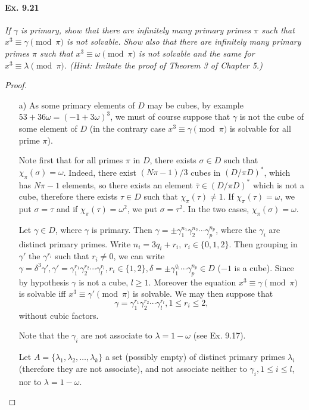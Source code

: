 \documentclass[11pt,a4paper]{article}
\begin{document}
\paragraph{Ex. 9.21}
{\it If $\gamma$ is primary, show that there are infinitely many primary primes $\pi$ such that $x^3 \equiv \gamma \pmod \pi$ is not solvable. Show also that there are infinitely many primary primes $\pi$ such that $x^3 \equiv \omega \pmod \pi$ is not solvable and the same for $x^3 \equiv \lambda \pmod \pi$. (Hint: Imitate the proof of Theorem 3 of Chapter 5.)
}

\begin{proof}
\begin{enumerate}
\item[a)] As some primary elements of $D$ may be cubes, by example $53 + 36 \omega = (-1 + 3 \omega)^3$, we must of course suppose that $\gamma$ is not the cube of some element of $D$ (in the contrary case $x^3 \equiv \gamma \pmod \pi $ is solvable for all prime $\pi$).

Note first that for all primes $\pi$ in $D$, there exists $\sigma \in D$ such that $\chi_\pi(\sigma) = \omega$. Indeed, there exist $(N\pi - 1)/3$ cubes in $(D/\pi D)^*$, which has $N\pi - 1$ elements, so there exists an element $\overline{\tau} \in (D/\pi D)^*$ which is not a cube, therefore there exists $\tau \in D$ such that $\chi_\pi(\tau) \neq 1$. If $\chi_\pi(\tau) = \omega$, we put $\sigma = \tau$ and if $\chi_\pi(\tau) = \omega^2$, we put $\sigma = \tau^2$. In the two cases, $\chi_\pi(\sigma) = \omega$.

\bigskip

Let $\gamma \in D$, where $\gamma$ is primary. Then $\gamma = \pm \gamma_1^{n_1}\gamma_2^{n_2}\cdots\gamma_p^{n_p}$, where the $\gamma_i$ are distinct primary primes. 
Write $n_i = 3q_i + r_i, \ r_i \in \{0,1,2\}$. Then grouping in $\gamma'$ the $\gamma^{r_i}$ such that $r_i \ne 0$, we can write $\gamma = \delta^3 \gamma', \gamma' = \gamma_1^{r_1} \gamma_2^{r_2}\cdots \gamma_l^{r_l}, r_i \in \{1,2\}, \delta = \pm \gamma_1^{q_1}\cdots\gamma_p^{n_p} \in D$ ($-1$ is a cube). Since by hypothesis $\gamma$ is not a cube, $l\geq 1$. Moreover the equation $x^3 \equiv \gamma \pmod \pi$ is solvable iff $x^3 \equiv \gamma' \pmod \pi$ is solvable. We may then suppose that $$\gamma = \gamma_1^{r_1} \gamma_2^{r_2}\cdots \gamma_l^{r_l}, 1\leq r_i \leq 2,$$ without cubic factors.

Note that the $\gamma_i$ are not associate to $\lambda = 1-\omega$ (see Ex. 9.17).

Let $A = \{\lambda_1,\lambda_2,\ldots, \lambda_k\}$  a set (possibly empty) of distinct primary primes $\lambda_i$ (therefore  they are not associate), and not associate neither to $\gamma_i, 1 \leq i \leq l$, nor to $\lambda = 1 - \omega$.


\end{enumerate}
\end{proof}
\end{document}
